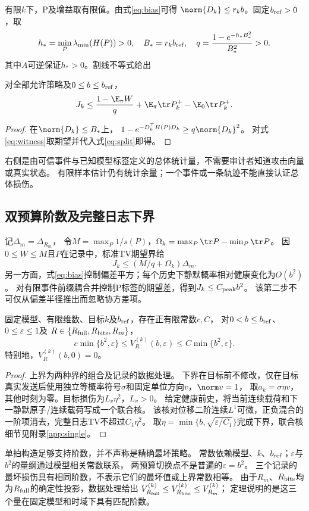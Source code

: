 有限$k$下，P及增益取有限值。由式\eqref{eq:bias}可得
$\norm{D_k}\le r_kb$。固定$b_{\rm ref}>0$，取
\[
h_*=\min_P\lambda_{\min}(H(P))>0,\quad
B_*=r_kb_{\rm ref},\quad q=\frac{1-e^{-h_*B_*^2}}{B_*^2}>0.
\]
其中$A$可逆保证$h_*>0$。割线不等式给出
\begin{proposition}[可信下一事件给出的总体损伤上界]
对全部允许策略及$0\le b\le b_{\rm ref}$，
\begin{equation}
J_k\le \frac{1-\E_\pi W}{q}
+\E_\pi\tr P_k^+-\E_0\tr P_k^+.
\label{eq:certificate}
\end{equation}
\end{proposition}
\begin{proof}
在$\norm{D_k}\le B_*$上，
$1-e^{-D_k^\top H(P)D_k}\ge q\norm{D_k}^2$。
对式\eqref{eq:witness}取期望并代入式\eqref{eq:split}即得。
\end{proof}
右侧是由可信事件与已知模型标签定义的总体统计量，不需要审计者知道攻击向量或真实状态。
有限样本估计仍有统计余量；一个事件或一条轨迹不能直接认证总体损伤。

\subsection{双预算阶数及完整日志下界}
记$\Delta_m=\Delta_{R_m}$，
令$M=\max_P1/s(P)$，$\Omega_k=\max_P\tr P-\min_P\tr P$。
因$0\le W\le M$且$P$在记录中，标准TV期望界给
\[
J_k\le(M/q+\Omega_k)\Delta_m.
\]
另一方面，式\eqref{eq:bias}控制偏差平方；每个历史下静默概率相对健康变化为$O(b^2)$。
对有限事件前缀耦合并控制P标签的期望差，得到$J_k\le C_{\rm peak}b^2$。
该第二步不可仅从偏差半径推出而忽略协方差项。

\begin{theorem}[精确反馈的有限时域损伤阶数]
\label{thm:exact}
固定模型、有限维数、目标$k$及$b_{\rm ref}$，存在正有限常数$c,C$，
对$0<b\le b_{\rm ref}$、$0\le\varepsilon\le1$及
$R\in\{R_{\rm full},R_{\rm bits},R_m\}$，
\begin{equation}
c\min\{b^2,\varepsilon\}\le V_R^{(k)}(b,\varepsilon)
\le C\min\{b^2,\varepsilon\}.
\label{eq:exact-bound}
\end{equation}
特别地，$V_R^{(k)}(b,0)=0$。
\end{theorem}
\begin{proof}
上界为两种界的组合及记录的数据处理。
下界在目标前不修改，仅在目标真实发送后使用独立等概率符号$\sigma$和固定单位方向$v$，$\norm v=1$，
取$a_k=\sigma\eta v$，其他时刻为零。目标损伤为$L_v\eta^2$，$L_v>0$。
给定健康前史，将当前连续载荷和下一静默原子/连续载荷写成一个联合核。
该核对位移二阶连续$L^1$可微，正负混合的一阶项消去，完整日志TV不超过$C_1\eta^2$。
取$\eta=\min\{b,\sqrt{\varepsilon/C_1}\}$完成下界，联合核细节见附录\ref{app:single}。
\end{proof}
单拍构造足够支持阶数，并不声称是精确最坏策略。
常数依赖模型、$k$、$b_{\rm ref}$；$\varepsilon$与$b^2$的量纲通过模型相关常数联系，
两预算切换点不是普遍的$\varepsilon=b^2$。
三个记录的最坏损伤具有相同阶数，不表示它们的最坏值或上界常数相等。
由于$R_m$、$R_{\rm bits}$均为$R_{\rm full}$的确定性投影，数据处理给出
$V_{R_{\rm full}}^{(k)}\le V_{R_{\rm bits}}^{(k)}\le V_{R_m}^{(k)}$；
定理说明的是这三个量在固定模型和时域下具有匹配阶数。

